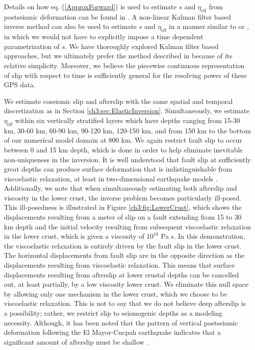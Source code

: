 Details on how eq. (\ref{ApproxForward}) is used to estimate $s$ and
$\eta_\mathrm{eff}$ from postseismic deformation can be found in
\citet{Hines2016}.  A non-linear Kalman filter based inverse method
can also be used to estimate $s$ and $\eta_{\mathrm{eff}}$ in a manner
similar to \citet{Segall1997} or \citet{McGuire2003}, in which we
would not have to explicitly impose a time dependent parametrization
of $s$. We have thoroughly explored Kalman filter based approaches,
but we ultimately prefer the method described in \citet{Hines2016}
because of its relative simplicity. Moreover, we believe the piecewise
continuous representation of slip with respect to time is sufficiently
general for the resolving power of these GPS data.

We estimate coseismic slip and afterslip with the same spatial and
temporal discretization as in Section \ref{ch3:sec:ElasticInversion}.
Simultaneously, we estimate $\eta_{\mathrm{eff}}$ within six
vertically stratified layers which have depths ranging from 15-30 km,
30-60 km, 60-90 km, 90-120 km, 120-150 km, and from 150 km to the
bottom of our numerical model domain at 800 km.  We again restrict
fault slip to occur between 0 and 15 km depth, which is done in order
to help eliminate inevitable non-uniqueness in the inversion.  It is
well understood that fault slip at sufficiently great depths can
produce surface deformation that is indistinguishable from
viscoelastic relaxation, at least in two-dimensional earthquake models
\citep{Savage1990}.  Additionally, we note that when simultaneously
estimating both afterslip and viscosity in the lower crust, the
inverse problem becomes particularly ill-posed. This ill-posedness is
illustrated in Figure \ref{ch3:fig:LowerCrust}, which shows the
displacements resulting from a meter of slip on a fault extending from
15 to 30 km depth and the initial velocity resulting from subsequent
viscoelastic relaxation in the lower crust, which is given a viscosity
of $10^{18}$ Pa s.  In this demonstration, the viscoelastic relaxation
is entirely driven by the fault slip in the lower crust.  The
horizontal displacements from fault slip are in the opposite direction
as the displacements resulting from viscoelastic relaxation.  This
means that surface displacements resulting from afterslip at lower
crustal depths can be cancelled out, at least partially, by a low
viscosity lower crust.  We eliminate this null space by allowing only
one mechanism in the lower crust, which we choose to be viscoelastic
relaxation.  This is not to say that we do not believe deep afterslip
is a possibility; rather, we restrict slip to seismogenic depths as a
modeling necessity. Although, it has been noted that the pattern of
vertical postseismic deformation following the El Mayor-Cucpah
earthquake indicates that a significant amount of afterslip must be
shallow \citep{Rollins2015}.
 
